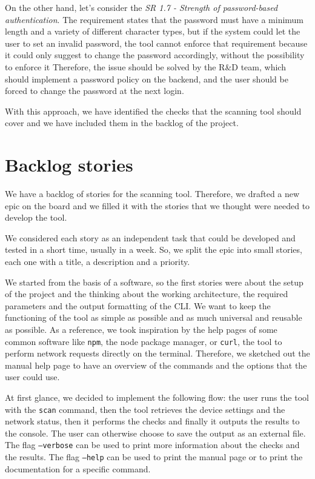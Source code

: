 On the other hand, let's consider the \textit{SR 1.7 - Strength of password-based authentication}. The requirement states that the password must have a minimum length and a variety of different character types, but if the system could let the user to set an invalid password, the tool cannot enforce that requirement because it could only suggest to change the password accordingly, without the possibility to enforce it Therefore, the issue should be solved by the R\&D team, which should implement a password policy on the backend, and the user should be forced to change the password at the next login.

With this approach, we have identified the checks that the scanning tool should cover and we have included them in the backlog of the project.

\section{Backlog stories}

We have a backlog of stories for the scanning tool. Therefore, we drafted a new epic on the board and we filled it with the stories that we thought were needed to develop the tool.

We considered each story as an independent task that could be developed and tested in a short time, usually in a week. So, we split the epic into small stories, each one with a title, a description and a priority.

We started from the basis of a software, so the first stories were about the setup of the project and the thinking about the working architecture, the required parameters and the output formatting of the CLI. We want to keep the functioning of the tool as simple as possible and as much universal and reusable as possible. As a reference, we took inspiration by the help pages of some common software like \texttt{npm}, the node package manager, or \texttt{curl}, the tool to perform network requests directly on the terminal. Therefore, we sketched out the manual help page to have an overview of the commands and the options that the user could use.

At first glance, we decided to implement the following flow: the user runs the tool with the \texttt{scan} command, then the tool retrieves the device settings and the network status, then it performs the checks and finally it outputs the results to the console. The user can otherwise choose to save the output as an external file. The flag \texttt{--verbose} can be used to print more information about the checks and the results. The flag \texttt{--help} can be used to print the manual page or to print the documentation for a specific command.

